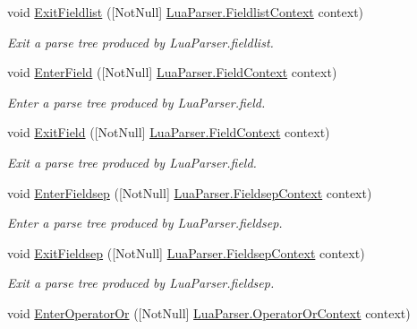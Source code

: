 \begin{DoxyCompactItemize}
void \mbox{\hyperlink{interfacezlua_1_1_i_lua_listener_a8fbc0020ba9e41655757791877b61985}{Exit\+Fieldlist}} (\mbox{[}Not\+Null\mbox{]} \mbox{\hyperlink{classzlua_1_1_lua_parser_1_1_fieldlist_context}{Lua\+Parser.\+Fieldlist\+Context}} context)
\begin{DoxyCompactList}\small\item\em Exit a parse tree produced by Lua\+Parser.\+fieldlist. \end{DoxyCompactList}\item 
void \mbox{\hyperlink{interfacezlua_1_1_i_lua_listener_abd670dc230362e0d50ad8dfffd50eb61}{Enter\+Field}} (\mbox{[}Not\+Null\mbox{]} \mbox{\hyperlink{classzlua_1_1_lua_parser_1_1_field_context}{Lua\+Parser.\+Field\+Context}} context)
\begin{DoxyCompactList}\small\item\em Enter a parse tree produced by Lua\+Parser.\+field. \end{DoxyCompactList}\item 
void \mbox{\hyperlink{interfacezlua_1_1_i_lua_listener_aa5a80474f82e45908ec603e36a505f84}{Exit\+Field}} (\mbox{[}Not\+Null\mbox{]} \mbox{\hyperlink{classzlua_1_1_lua_parser_1_1_field_context}{Lua\+Parser.\+Field\+Context}} context)
\begin{DoxyCompactList}\small\item\em Exit a parse tree produced by Lua\+Parser.\+field. \end{DoxyCompactList}\item 
void \mbox{\hyperlink{interfacezlua_1_1_i_lua_listener_a9ee512ebb70fc9f3fe8bcc35b0e6efe4}{Enter\+Fieldsep}} (\mbox{[}Not\+Null\mbox{]} \mbox{\hyperlink{classzlua_1_1_lua_parser_1_1_fieldsep_context}{Lua\+Parser.\+Fieldsep\+Context}} context)
\begin{DoxyCompactList}\small\item\em Enter a parse tree produced by Lua\+Parser.\+fieldsep. \end{DoxyCompactList}\item 
void \mbox{\hyperlink{interfacezlua_1_1_i_lua_listener_a3b2a4e6980def8cb07c26f52be3c22de}{Exit\+Fieldsep}} (\mbox{[}Not\+Null\mbox{]} \mbox{\hyperlink{classzlua_1_1_lua_parser_1_1_fieldsep_context}{Lua\+Parser.\+Fieldsep\+Context}} context)
\begin{DoxyCompactList}\small\item\em Exit a parse tree produced by Lua\+Parser.\+fieldsep. \end{DoxyCompactList}\item 
void \mbox{\hyperlink{interfacezlua_1_1_i_lua_listener_a9e722ddbc7e68d0fc367518365257711}{Enter\+Operator\+Or}} (\mbox{[}Not\+Null\mbox{]} \mbox{\hyperlink{classzlua_1_1_lua_parser_1_1_operator_or_context}{Lua\+Parser.\+Operator\+Or\+Context}} context)

\end{DoxyCompactItemize}
